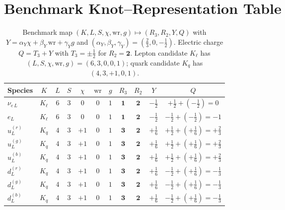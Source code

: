 \documentclass[10pt,reprint,aps,onecolumn,nofootinbib]{revtex4-2}
\begin{document}
\section{Benchmark Knot–Representation Table}\label{app:knot-rep-table}
    \begin{table}[htbp]
    \centering
    \small
    \caption{Benchmark map $(K, L, S, \chi, \mathrm{wr}, g)\mapsto (R_3,R_2,Y,Q)$ with
        $Y=\alpha_Y\chi+\beta_Y\,\mathrm{wr}+\gamma_Y g$ and $(\alpha_Y,\beta_Y,\gamma_Y)=(\tfrac{2}{3},0,-\tfrac{1}{2})$.
        Electric charge $Q=T_3+Y$ with $T_3=\pm\tfrac12$ for $R_2=\mathbf{2}$.
        Lepton candidate $K_\ell$ has $(L,S,\chi,\mathrm{wr},g)=(6,3,0,0,1)$; quark candidate $K_q$ has $(4,3,+1,0,1)$.}
    \label{tab:knot-rep-benchmark}
    \begin{tabular}{lcccccccccc}
    \toprule
    Species & $K$ & $L$ & $S$ & $\chi$ & $\mathrm{wr}$ & $g$ & $R_3$ & $R_2$ & $Y$ & $Q$ \\
    \midrule
    $\nu_{e\,L}$  & $K_\ell$ & $6$ & $3$ & $0$ & $0$ & $1$ & $\mathbf{1}$ & $\mathbf{2}$ & $-\tfrac{1}{2}$ & $+\tfrac{1}{2}+(-\tfrac{1}{2})=0$ \\
    $e_{L}$       & $K_\ell$ & $6$ & $3$ & $0$ & $0$ & $1$ & $\mathbf{1}$ & $\mathbf{2}$ & $-\tfrac{1}{2}$ & $-\tfrac{1}{2}+(-\tfrac{1}{2})=-1$ \\
    \addlinespace[0.25em]
    $u_{L}^{(r)}$ & $K_q$    & $4$ & $3$ & $+1$& $0$ & $1$ & $\mathbf{3}$ & $\mathbf{2}$ & $+\tfrac{1}{6}$ & $+\tfrac{1}{2}+(+\tfrac{1}{6})=+\tfrac{2}{3}$ \\
    $u_{L}^{(g)}$ & $K_q$    & $4$ & $3$ & $+1$& $0$ & $1$ & $\mathbf{3}$ & $\mathbf{2}$ & $+\tfrac{1}{6}$ & $+\tfrac{1}{2}+(+\tfrac{1}{6})=+\tfrac{2}{3}$ \\
    $u_{L}^{(b)}$ & $K_q$    & $4$ & $3$ & $+1$& $0$ & $1$ & $\mathbf{3}$ & $\mathbf{2}$ & $+\tfrac{1}{6}$ & $+\tfrac{1}{2}+(+\tfrac{1}{6})=+\tfrac{2}{3}$ \\
    $d_{L}^{(r)}$ & $K_q$    & $4$ & $3$ & $+1$& $0$ & $1$ & $\mathbf{3}$ & $\mathbf{2}$ & $+\tfrac{1}{6}$ & $-\tfrac{1}{2}+(+\tfrac{1}{6})=-\tfrac{1}{3}$ \\
    $d_{L}^{(g)}$ & $K_q$    & $4$ & $3$ & $+1$& $0$ & $1$ & $\mathbf{3}$ & $\mathbf{2}$ & $+\tfrac{1}{6}$ & $-\tfrac{1}{2}+(+\tfrac{1}{6})=-\tfrac{1}{3}$ \\
    $d_{L}^{(b)}$ & $K_q$    & $4$ & $3$ & $+1$& $0$ & $1$ & $\mathbf{3}$ & $\mathbf{2}$ & $+\tfrac{1}{6}$ & $-\tfrac{1}{2}+(+\tfrac{1}{6})=-\tfrac{1}{3}$ \\
    \bottomrule
    \end{tabular}
    \end{table}
\end{document}
